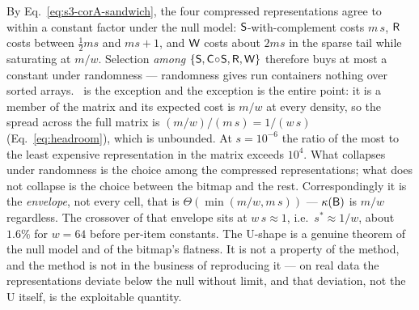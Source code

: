 By Eq.~\eqref{eq:s3-corA-sandwich}, the four compressed representations agree to within a constant
factor under the null model: $\textsf{S}$-with-complement costs $m\,s$, $\textsf{R}$ costs between $\tfrac12ms$ and
$ms+1$, and $\textsf{W}$ costs about $2ms$ in the sparse tail while saturating at $m/w$. Selection
\emph{among} $\{\textsf{S},\textsf{C}\!\circ\!\textsf{S},\textsf{R},\textsf{W}\}$ therefore buys at most a constant under randomness ---
randomness gives run containers nothing over sorted arrays. \rB\ is the exception and the exception is
the entire point: it is a member of the matrix and its expected cost is $m/w$ at every density, so the
spread across the full matrix is $(m/w)/(m\,s)=1/(w\,s)$ (Eq.~\eqref{eq:headroom}), which is unbounded.
At $s=10^{-6}$ the ratio of the most to the least expensive representation in the matrix exceeds
$10^4$. What collapses under randomness is the choice among the compressed representations; what does
not collapse is the choice between the bitmap and the rest. Correspondingly it is the \emph{envelope},
not every cell, that is $\Theta(\min(m/w,m\,s))$ --- $\kappa(\textsf{B})$ is $m/w$ regardless. The crossover of
that envelope sits at $w\,s\approx1$, i.e.\ $s^*\approx1/w$, about $1.6\%$ for $w=64$ before per-item
constants. The U-shape is a genuine theorem of the null model and of the bitmap's flatness. It
is not a property of the method, and the method is not in the business of reproducing it --- on real
data the representations deviate below the null without limit, and that deviation, not the U itself, is
the exploitable quantity.

